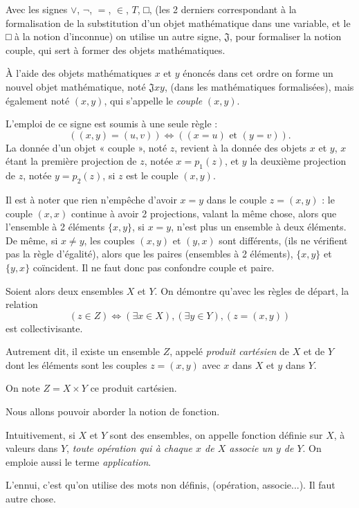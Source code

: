 
Avec les signes $\lor$, $\neg$, $=$, $\in$, $T$, □, (les 2 derniers correspondant à la formalisation de la substitution d'un objet mathématique dans une variable, et le □ à la notion d'inconnue) on utilise un autre signe, $\mathfrak J$, pour formaliser la notion couple, qui sert à former des objets mathématiques.

À l'aide des objets mathématiques $x$ et $y$ énoncés dans cet ordre on forme un nouvel objet mathématique, noté $\mathfrak Jxy$, (dans les mathématiques formalisées), mais également noté $(x,y)$, qui s'appelle le \emph{couple} $(x,y)$.

L'emploi de ce signe est soumis à une seule règle :
\[
((x,y)=(u,v))\Leftrightarrow((x=u)\text{ et }(y=v)).
\]
La donnée d'un objet « couple », noté $z$, revient à la donnée des objets $x$ et $y$, $x$ étant la première projection de $z$, notée $x=p_1(z)$, et $y$ la deuxième projection de $z$, notée $y=p_2(z)$, si $z$ est le couple $(x,y)$.

Il est à noter que rien n'empêche d'avoir $x=y$ dans le couple $z=(x,y)$ : le couple $(x,x)$ continue à avoir 2 projections, valant la même chose, alors que l'ensemble à 2 éléments $\{x,y\}$, si $x=y$, n'est plus un ensemble à deux éléments. De même, si $x\ne y$, les couples $(x,y)$ et $(y,x)$ sont différents, (ils ne vérifient pas la règle d'égalité), alors que les paires (ensembles à 2 éléments), $\{x,y\}$ et $\{y,x\}$ coïncident. Il ne faut donc pas confondre couple et paire.

Soient alors deux ensembles $X$ et $Y$. On démontre qu'avec les règles de départ, la relation
\[
(z\in Z)\Leftrightarrow(\exists x\in X),(\exists y\in Y),(z=(x,y))
\]
est collectivisante.

Autrement dit, il existe un ensemble $Z$, appelé \emph{produit cartésien} de $X$ et de $Y$ dont les éléments sont les couples $z=(x,y)$ avec $x$ dans $X$ et $y$ dans $Y$.

On note $Z=X\times Y$ ce produit cartésien.

Nous allons pouvoir aborder la notion de fonction.

Intuitivement, si $X$ et $Y$ sont des ensembles, on appelle fonction définie sur $X$, à valeurs dans $Y$, \emph{toute opération qui à chaque $x$ de $X$ associe un $y$ de $Y$}. On emploie aussi le terme \emph{application}.

L'ennui, c'est qu'on utilise des mots non définis, (opération, associe...). Il faut autre chose.

